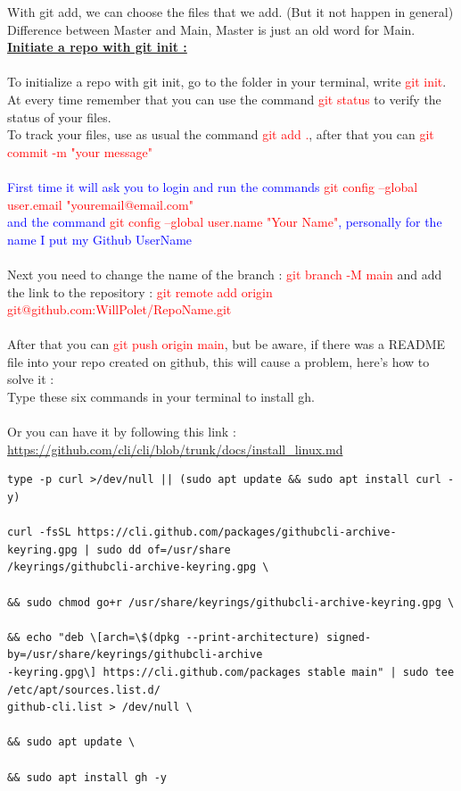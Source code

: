 \documentclass{article}
\begin{document}
With git add, we can choose the files that we add. (But it not happen in general) \\
Difference between Master and Main, Master is just an old word for Main. \\
\newpage
\noindent\textbf{\underline{Initiate a repo with git init :}} \\ \\
To initialize a repo with git init, go to the folder in your terminal, write \textcolor{red}{git init}. \\
At every time remember that you can use the command \textcolor{red}{git status} to verify the status of your files. \\
To track your files, use as usual the command \textcolor{red}{git add .}, after that you can \textcolor{red}{git commit -m "your message"} \\ \\
\textcolor{blue}{First time it will ask you to login and run the commands \textcolor{red}{git config --global user.email "youremail@email.com"} \\
and the command \textcolor{red}{git config --global user.name "Your Name"}, personally for the name I put my Github UserName} \\ \\
Next you need to change the name of the branch : \textcolor{red}{git branch -M main} and add the link to the repository : \textcolor{red}{git remote add origin git@github.com:WillPolet/RepoName.git} \\ \\
After that you can \textcolor{red}{git push origin main}, but be aware, if there was a README file into your repo created on github, this will cause a problem, here's how to solve it : \\
Type these six commands in your terminal to install gh. \\ \\
Or you can have it by following this link :
\url{https://github.com/cli/cli/blob/trunk/docs/install_linux.md}
{
\color{blue}%
\begin{verbatim}
type -p curl >/dev/null || (sudo apt update && sudo apt install curl -y)

curl -fsSL https://cli.github.com/packages/githubcli-archive-keyring.gpg | sudo dd of=/usr/share
/keyrings/githubcli-archive-keyring.gpg \

&& sudo chmod go+r /usr/share/keyrings/githubcli-archive-keyring.gpg \ 

&& echo "deb \[arch=\$(dpkg --print-architecture) signed-by=/usr/share/keyrings/githubcli-archive
-keyring.gpg\] https://cli.github.com/packages stable main" | sudo tee /etc/apt/sources.list.d/
github-cli.list > /dev/null \ 

&& sudo apt update \ 

&& sudo apt install gh -y 
\end{verbatim}
}
\end{document}
